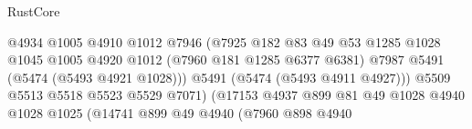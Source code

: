 \begin{lexlean}{RustCore}
\begin{coremodule}
                                                    @4934
                                                    @1005
                                                    @4910
                                                    @1012
                                                    @7946
                                                    (@7925
                                                      @182
                                                      @83
                                                      @49
                                                      @53
                                                      @1285
                                                      @1028
                                                      @1045
                                                      @1005
                                                      @4920
                                                      @1012
                                                      (@7960 @181 @1285 @6377 @6381)
                                                      @7987
                                                      @5491
                                                      (@5474 (@5493 @4921 @1028)))
                                                    @5491
                                                    (@5474 (@5493 @4911 @4927)))
                                                  @5509
                                                  @5513
                                                  @5518
                                                  @5523
                                                  @5529
                                                  @7071)
                                                (@17153
                                                  @4937
                                                  @899
                                                  @81
                                                  @49
                                                  @1028
                                                  @4940
                                                  @1028
                                                  @1025
                                                  (@14741
                                                    @899
                                                    @49
                                                    @4940
                                                    (@7960
                                                      @898
                                                      @4940

\end{coremodule}
\end{lexlean}
